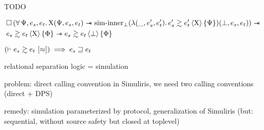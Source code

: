 


TODO

\clearpage

\begin{theorem}
    \begin{align*}
            &
            \iPersistent \left(
                \forall \iPredTwo, \datalangExpr_s, \datalangExpr_t \ldotp
                \iProt (\iPredTwo, \datalangExpr_s, \datalangExpr_t) \iSepImp
                \mathrm{sim \mathhyphen inner}_\bot (\lambdaAbs (\_, \datalangExpr_s', \datalangExpr_t') \ldotp \iSim[\iProt]{\iPredTwo}{\datalangExpr_s'}{\datalangExpr_t'}) (\bot, \datalangExpr_s, \datalangExpr_t)
            \right) \iSepImp
        \\
            &
            \iSim[\iProt]{\iPred}{\datalangExpr_s}{\datalangExpr_t} \iSepImp
            \iSim[\bot]{\iPred}{\datalangExpr_s}{\datalangExpr_t}
    \end{align*}
\end{theorem}

\begin{theorem}[Adequacy]
    $
        \left( \vdash \iSimv{\iSimilar}{\datalangExpr_s}{\datalangExpr_t} \right) \implies
        \datalangExpr_s \refined \datalangExpr_t
    $
\end{theorem}

relational separation logic = simulation

problem: direct calling convention in Simuliris, we need two calling conventions (direct + DPS)

remedy: simulation parameterized by protocol, generalization of Simuliris (but: sequential, without source safety but closed at toplevel)



